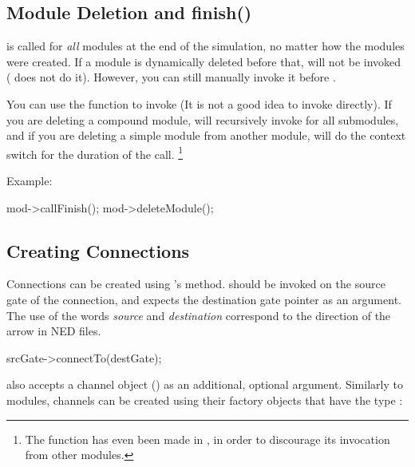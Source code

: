 \begin{ned}
\begin{cpp}
\end{cpp}


\subsection{Module Deletion and finish()}
\label{sec:simple-modules:module-deletion-and-finish}

 is called for \textit{all} modules at the end of the
simulation, no matter how the modules were created. If a module is
dynamically deleted before that,  will not be invoked
( does not do it). However, you can still manually
invoke it before .

You can use the  function to invoke 
(It is not a good idea to invoke  directly). If you are
deleting a compound module,  will recursively invoke
 for all submodules, and if you are deleting a simple
module from another module,  will do the context switch
for the duration of the call.
  \footnote{The  function has even been made 
  in , in order to discourage its invocation from
  other modules.}

Example:

\begin{cpp}
mod->callFinish();
mod->deleteModule();
\end{cpp}


\subsection{Creating Connections}
\label{sec:simple-modules:creating-connections}

Connections can be created using 's 
method.  should be invoked on the source gate
of the connection, and expects the destination gate pointer as
an argument. The use of the words \textit{source} and \textit{destination}
correspond to the direction of the arrow in NED files.

\begin{cpp}
srcGate->connectTo(destGate);
\end{cpp}

 also accepts a channel object () as an
additional, optional argument. Similarly to modules, channels can be
created using their factory objects that have the type :


\end{ned}
